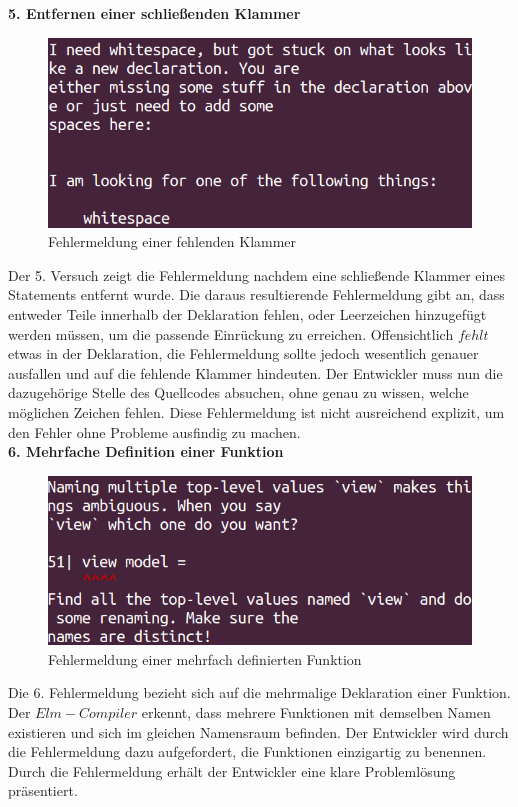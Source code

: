 \textbf{5. Entfernen einer schließenden Klammer}\\
\begin{figure}[h!]
\centering
\includegraphics[scale=0.5]{img/missing-brackets-error.png}
\caption{Fehlermeldung einer fehlenden Klammer}
\end{figure}
Der 5. Versuch zeigt die Fehlermeldung nachdem eine schließende Klammer eines Statements entfernt wurde. Die daraus resultierende Fehlermeldung gibt an, dass entweder Teile innerhalb der Deklaration fehlen, oder Leerzeichen hinzugefügt werden müssen, um die passende Einrückung zu erreichen. Offensichtlich $fehlt$ etwas in der Deklaration, die Fehlermeldung sollte jedoch wesentlich genauer ausfallen und auf die fehlende Klammer hindeuten. Der Entwickler muss nun die dazugehörige Stelle des Quellcodes absuchen, ohne genau zu wissen, welche möglichen Zeichen fehlen. Diese Fehlermeldung ist nicht ausreichend explizit, um den Fehler ohne Probleme ausfindig zu machen.
\\

\textbf{6. Mehrfache Definition einer Funktion}\\
\begin{figure}[h!]
\centering
\includegraphics[scale=0.5]{img/multiple-function-definitions.png}
\caption{Fehlermeldung einer mehrfach definierten Funktion}
\end{figure}
Die 6. Fehlermeldung bezieht sich auf die mehrmalige Deklaration einer Funktion. Der $Elm-Compiler$ erkennt, dass mehrere Funktionen mit demselben Namen existieren und sich im gleichen Namensraum befinden. Der Entwickler wird durch die Fehlermeldung dazu aufgefordert, die Funktionen einzigartig zu benennen. Durch die Fehlermeldung erhält der Entwickler eine klare Problemlösung präsentiert.

